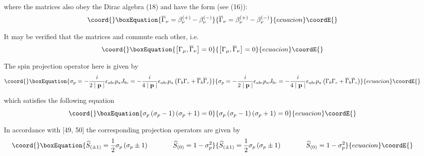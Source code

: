 \documentclass[a4paper,12pt]{article}
\begin{document}
where the matrices \myHighlight{$\overline{\Gamma }_\nu $}\coordHE{} also obey the Dirac algebra
(18) and have the form (see (16)):
\begin{equation}\coord{}\boxEquation{
\overline{\Gamma }_\nu =\beta _\nu ^{(+)}-\beta _\nu ^{(-)}  \label{24}
}{
\overline{\Gamma }_\nu =\beta _\nu ^{(+)}-\beta _\nu ^{(-)}  }{ecuacion}\coordE{}\end{equation}

It may be verified that the matrices \myHighlight{$\Gamma _\mu $}\coordHE{} and
\myHighlight{$\overline{\Gamma } _\nu $}\coordHE{} commute each other, i.e.
\begin{equation}\coord{}\boxEquation{
\left[ \Gamma _\mu ,\overline{\Gamma }_\nu \right] =0  \label{25}
}{
\left[ \Gamma _\mu ,\overline{\Gamma }_\nu \right] =0  }{ecuacion}\coordE{}\end{equation}

The spin projection operator here is given by
\begin{equation}\coord{}\boxEquation{
\sigma _p=-\frac i{2\mid \mathbf{p}\mid }\epsilon _{abc}p_aJ_{bc}=-\frac
i{4\mid \mathbf{p}\mid }\epsilon _{abc}p_a\left( \Gamma _b\Gamma _c+
\overline{\Gamma }_b\overline{\Gamma }_c\right)  \label{26}
}{
\sigma _p=-\frac i{2\mid \mathbf{p}\mid }\epsilon _{abc}p_aJ_{bc}=-\frac
i{4\mid \mathbf{p}\mid }\epsilon _{abc}p_a\left( \Gamma _b\Gamma _c+
\overline{\Gamma }_b\overline{\Gamma }_c\right)  }{ecuacion}\coordE{}\end{equation}

which satisfies the following equation
\begin{equation}\coord{}\boxEquation{
\sigma _p\left( \sigma _p-1\right) \left( \sigma _p+1\right) =0  \label{27}
}{
\sigma _p\left( \sigma _p-1\right) \left( \sigma _p+1\right) =0  }{ecuacion}\coordE{}\end{equation}

In accordance with [49, 50] the corresponding projection operators are given
by
\begin{equation}\coord{}\boxEquation{
\widehat{S}_{(\pm 1)}=\frac 12\sigma _p\left( \sigma _p\pm
1\right) \hspace{0.5in}\widehat{S}_{(0)}=1-\sigma _p^2  \label{28}
}{
\widehat{S}_{(\pm 1)}=\frac 12\sigma _p\left( \sigma _p\pm
1\right) \hspace{0.5in}\widehat{S}_{(0)}=1-\sigma _p^2  }{ecuacion}\coordE{}\end{equation}
\end{document}
